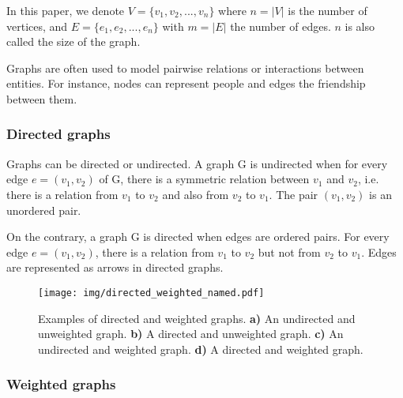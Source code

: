 \documentclass[table]{report}
\begin{document}



\noindent
In this paper, we denote $V = \{v_1,v_2,...,v_n\}$ where $n = |V|$ is the number of vertices, and $E = \{e_1, e_2,..., e_n\}$ with $m = |E|$ the number of edges. $n$ is also called the size of the graph.


\medbreak
\noindent
Graphs are often used to model pairwise relations or interactions between entities. For instance, nodes can represent people and edges the friendship between them.





\subsubsection{Directed graphs}


Graphs can be directed or undirected. A graph G is undirected when for every edge $e = (v_1,v_2)$ of G, there is a symmetric relation between $v_1$ and $v_2$, i.e.  there is a relation from $v_1$ to $v_2$ and also from $v_2$ to $v_1$. The pair $(v_1,v_2)$ is an unordered pair. 


\medbreak
On the contrary, a graph G is directed when edges are ordered pairs. For every edge $e = (v_1, v_2)$, there is a relation from $v_1$ to $v_2$ but not from $v_2$ to $v_1$. Edges are represented as arrows in directed graphs. 

\begin{figure}[h]%
\centering
\texttt{[image: img/directed\_weighted\_named.pdf]}
\caption{Examples of directed and weighted graphs. 
\textbf{a)} An undirected and unweighted graph.
\textbf{b)} A directed and unweighted graph.
\textbf{c)} An undirected and weighted graph.
\textbf{d)} A directed and weighted graph.}
\label{fig:directed_weighted_examples}
\end{figure}


\subsubsection{Weighted graphs}
\end{document}
